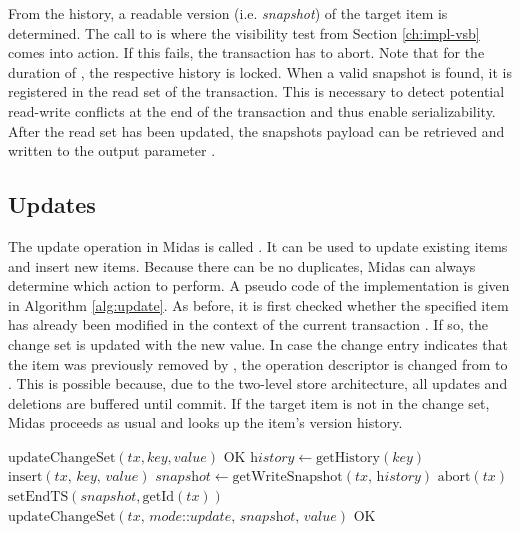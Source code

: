 From the history, a readable version (i.e. \emph{snapshot}) of the target item is determined. The call to  is where the visibility test from Section \ref{ch:impl-vsb} comes into action. If this fails, the transaction has to abort. Note that for the duration of , the respective history is locked. When a valid snapshot is found, it is registered in the read set of the transaction. This is necessary to detect potential read-write conflicts at the end of the transaction and thus enable serializability. After the read set has been updated, the snapshots payload can be retrieved and written to the output parameter .

\subsection{Updates}

The update operation in Midas is called . It can be used to update existing items and insert new items. Because there can be no duplicates, Midas can always determine which action to perform. A pseudo code of the implementation is given in Algorithm \ref{alg:update}. As before, it is first checked whether the specified item has already been modified in the context of the current transaction . If so, the change set is updated with the new value. In case the change entry indicates that the item was previously removed by , the operation descriptor is changed from  to . This is possible because, due to the two-level store architecture, all updates and deletions are buffered until commit. If the target item is not in the change set, Midas proceeds as usual and looks up the item's version history.

\begin{algorithm}
\begin{algorithmic}[1]
\State $\text{updateChangeSet}(tx, key, value)$
\State \Return $\text{OK}$
\EndIf
\State $\textit{history} \gets \text{getHistory}(\textit{key})$
\State \Return $\text{insert}(\textit{tx, key, value})$
\EndIf
\State $\textit{snapshot} \gets \text{getWriteSnapshot}(\textit{tx, history})$
\State \Return $\text{abort}(tx)$
\EndIf
\State $\text{setEndTS}(snapshot, \text{getId}(tx))$
\State $\text{updateChangeSet}(\textit{tx, mode::update, snapshot, value})$
\State \Return $\text{OK}$
\EndProcedure
\end{algorithmic}
\caption{}
\label{alg:update}
\end{algorithm}

